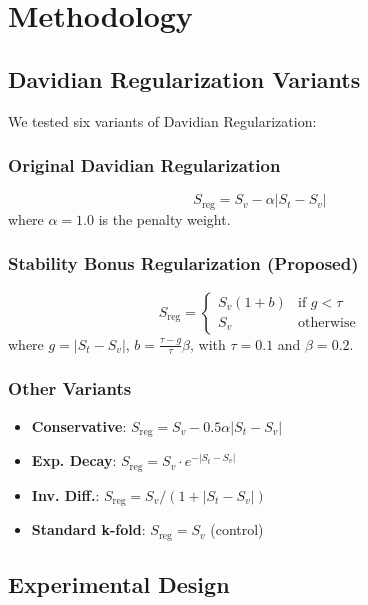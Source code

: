\documentclass[twoside,11pt]{article}
\begin{document}
\section{Methodology}

\subsection{Davidian Regularization Variants}

We tested six variants of Davidian Regularization:

\subsubsection{Original Davidian Regularization}
\begin{equation}
S_{\text{reg}} = S_v - \alpha |S_t - S_v|
\end{equation}
where $\alpha = 1.0$ is the penalty weight.

\subsubsection{Stability Bonus Regularization (Proposed)}
\begin{equation}
S_{\text{reg}} = \begin{cases}
S_v (1 + b) & \text{if } g < \tau \\
S_v & \text{otherwise}
\end{cases}
\end{equation}
where $g = |S_t - S_v|$, $b = \frac{\tau - g}{\tau} \beta$, with $\tau = 0.1$ and $\beta = 0.2$.

\subsubsection{Other Variants}
\begin{itemize}
    \item \textbf{Conservative}: $S_{\text{reg}} = S_v - 0.5\alpha|S_t - S_v|$
    \item \textbf{Exp. Decay}: $S_{\text{reg}} = S_v \cdot e^{-|S_t - S_v|}$
    \item \textbf{Inv. Diff.}: $S_{\text{reg}} = S_v / (1 + |S_t - S_v|)$
    \item \textbf{Standard k-fold}: $S_{\text{reg}} = S_v$ (control)
\end{itemize}

\subsection{Experimental Design}
\end{document}
